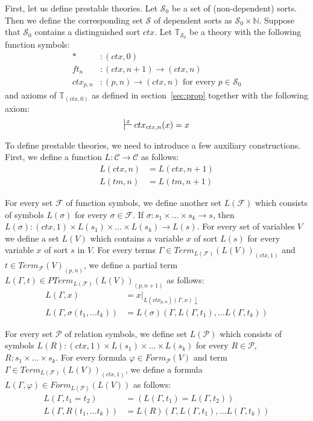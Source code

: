 \documentclass[reqno]{amsart}
\theoremstyle{definition}
\theoremstyle{remark}
\newcommand{\emptyCtx}{*}
\numberwithin{figure}{section}
\begin{document}
First, let us define prestable theories.
Let $\mathcal{S}_0$ be a set of (non-dependent) sorts.
Then we define the corresponding set $\mathcal{S}$ of dependent sorts as $\mathcal{S}_0 \times \mathbb{N}$.
Suppose that $\mathcal{S}_0$ contains a distinguished sort $ctx$.
Let $\mathbb{T}_{\mathcal{S}_0}$ be a theory with the following function symbols:
\begin{align*}
\emptyCtx  &: (ctx,0) \\
ft_n & : (ctx,n+1) \to (ctx,n) \\
ctx_{p,n} & : (p,n) \to (ctx,n) \text{ for every } p \in \mathcal{S}_0
\end{align*}
and axioms of $\mathbb{T}_{(ctx,0)}$ as defined in section~\ref{sec:prop} together with the following axiom:
\[ \sststile{}{x} ctx_{ctx,n}(x) = x \]

To define prestable theories, we need to introduce a few auxiliary constructions.
First, we define a function $L : \mathcal{C} \to \mathcal{C}$ as follows:
\begin{align*}
L(ctx,n) & = L(ctx,n+1) \\
L(tm,n) & = L(tm,n+1)
\end{align*}

For every set $\mathcal{F}$ of function symbols, we define another set $L(\mathcal{F})$ which consists of symbols $L(\sigma)$ for every $\sigma \in \mathcal{F}$.
If $\sigma : s_1 \times \ldots \times s_k \to s$, then $L(\sigma) : (ctx,1) \times L(s_1) \times \ldots \times L(s_k) \to L(s)$.
For every set of variables $V$ we define a set $L(V)$ which contains a variable $x$ of sort $L(s)$ for every variable $x$ of sort $s$ in $V$.
For every terms $\Gamma \in Term_{L(\mathcal{F})}(L(V))_{(ctx,1)}$ and $t \in Term_{\mathcal{F}}(V)_{(p,n)}$,
we define a partial term $L(\Gamma,t) \in PTerm_{L(\mathcal{F})}(L(V))_{(p,n+1)}$ as follows:
\begin{align*}
L(\Gamma, x) & = x|_{L(ctx_{p,n})(\Gamma, x) \downarrow} \\
L(\Gamma, \sigma(t_1, \ldots t_k)) & = L(\sigma)(\Gamma, L(\Gamma, t_1), \ldots L(\Gamma, t_k))
\end{align*}

For every set $\mathcal{P}$ of relation symbols, we define set $L(\mathcal{P})$ which consists of symbols
    $L(R) : (ctx,1) \times L(s_1) \times \ldots \times L(s_k)$ for every $R \in \mathcal{P}$, $R : s_1 \times \ldots \times s_k$.
For every formula $\varphi \in Form_\mathcal{P}(V)$ and term $\Gamma \in Term_{L(\mathcal{F})}(L(V))_{(ctx,1)}$,
we define a formula $L(\Gamma, \varphi) \in Form_{L(\mathcal{P})}(L(V))$ as follows:
\begin{align*}
L(\Gamma, t_1 = t_2) & = (L(\Gamma, t_1) = L(\Gamma, t_2)) \\
L(\Gamma, R(t_1, \ldots t_k)) & = L(R)(\Gamma, L(\Gamma, t_1), \ldots L(\Gamma, t_k))
\end{align*}
\end{document}

